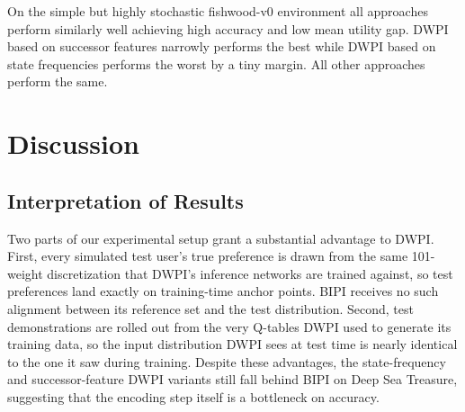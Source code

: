 \documentclass[11pt]{article}
\begin{document}
On the simple but highly stochastic fishwood-v0 environment all approaches perform similarly well achieving high accuracy and low mean utility gap. DWPI based on successor features narrowly performs the best while DWPI based on state frequencies performs the worst by a tiny margin. All other approaches perform the same.


\section{Discussion}

\subsection*{Interpretation of Results}

Two parts of our experimental setup grant a substantial advantage to DWPI. First, every simulated test user's true preference is drawn from the same 101-weight discretization that DWPI's inference networks are trained against, so test preferences land exactly on training-time anchor points. BIPI receives no such alignment between its reference set and the test distribution. Second, test demonstrations are rolled out from the very Q-tables DWPI used to generate its training data, so the input distribution DWPI sees at test time is nearly identical to the one it saw during training. Despite these advantages, the state-frequency and successor-feature DWPI variants still fall behind BIPI on Deep Sea Treasure, suggesting that the encoding step itself is a bottleneck on accuracy.
\end{document}

